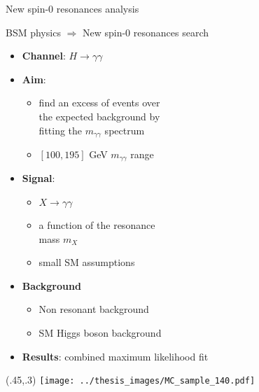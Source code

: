 \documentclass[10pt,UKenglish, leqno, xcolor = dvipsnames]{beamer}
\begin{document}
	\begin{frame}{New spin-0 resonances analysis}
		\vfill
		\begin{center}
			BSM physics $\Rightarrow$ New spin-0 resonances search
		\end{center}
		\begin{itemize}
			\item \textbf{Channel}: $H \to \gamma\gamma$
			\item \textbf{Aim}: 
			\begin{itemize}
				\item find an excess of events over \\the expected background by\\ fitting the $m_{\gamma\gamma}$ spectrum
				\item $[100,195]$ GeV $m_{\gamma\gamma}$ range
			\end{itemize}
			
			\item \textbf{Signal}:
			\begin{itemize}
				\item $X \to \gamma\gamma$ 
				\item a function of the resonance\\ mass $m_X$
				\item small SM assumptions
			\end{itemize}
			\item \textbf{Background}
			\begin{itemize}
				\item Non resonant background
				\item SM Higgs boson background
			\end{itemize}
			\item \textbf{Results}: combined maximum likelihood fit
		\end{itemize}
		\vfill 
		\begin{textblock}{1}(.45,.3)
			\texttt{[image: ../thesis\_images/MC\_sample\_140.pdf]}
		\end{textblock}
	\end{frame}
	
\end{document}
